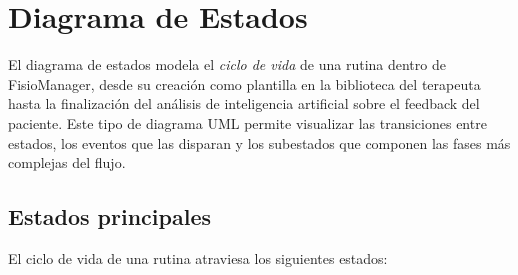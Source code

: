 
\chapter{Diagrama de Estados}\label{ch:diagramaestados}

El diagrama de estados modela el \emph{ciclo de vida} de una rutina dentro de FisioManager, desde su creación como plantilla en la biblioteca del terapeuta hasta la finalización del análisis de inteligencia artificial sobre el feedback del paciente. Este tipo de diagrama UML permite visualizar las transiciones entre estados, los eventos que las disparan y los subestados que componen las fases más complejas del flujo.

\section{Estados principales}

El ciclo de vida de una rutina atraviesa los siguientes estados:

